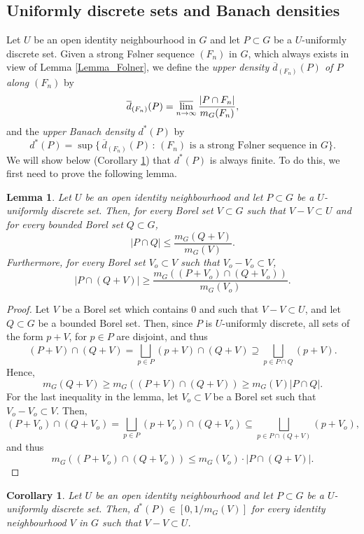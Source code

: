\documentclass[12pt,reqno,a4paper]{amsart}
\numberwithin{equation}{section}
\newcommand{\ra}{\rightarrow}
\theoremstyle{theorem}
\newtheorem{corollary}[theorem]{Corollary}
\newtheorem{lemma}[theorem]{Lemma}
\theoremstyle{task}
\theoremstyle{definition}
\begin{document}
\subsection{Uniformly discrete sets and Banach densities}
\label{subsec:Banach}
Let $U$ be an open identity neighbourhood in $G$ and let $P \subset G$ be a $U$-uniformly discrete set. Given a strong F\o lner sequence $(F_n)$ in $G$, which always exists in view of Lemma \ref{Lemma_Folner}, we define
the \emph{upper density $\overline{d}_{(F_n)}(P)$ of $P$ along $(F_n)$} by 
\[
\overline{d}_{(F_n)}(P) = \varlimsup_{n \ra \infty} \frac{|P \cap F_n|}{m_G(F_n)},
\]
and the \emph{upper Banach density $d^*(P)$} by
\[
d^*(P) = \sup \big\{ \, \overline{d}_{(F_n)}(P) \, : \, \textrm{$(F_n)$ is a strong F\o lner sequence in $G$} \big\}.
\]
We will show below (Corollary \ref{cor_dstarfinite}) that $d^*(P)$ is always finite. To do this, we first need to prove the following lemma.
\begin{lemma}
\label{Lemma_UQV}
Let $U$ be an open identity neighbourhood and let $P \subset G$ be a $U$-uniformly discrete set. Then, for every  Borel set $V \subset G$ such that $V-V \subset U$
and for every bounded Borel set $Q \subset G$,
\[
|P \cap Q| \leq \frac{m_G(Q+V)}{m_G(V)}.
\]
Furthermore, for every Borel set $V_o \subset V$ such that $V_o - V_o \subset V$, 
\[
|P \cap (Q+V)| \geq \frac{m_G((P+V_o) \cap (Q+V_o))}{m_G(V_o)}.
\]
\end{lemma}

\begin{proof}
Let $V$ be a Borel set which contains $0$ and such that $V - V \subset U$, and let $Q \subset G$ be a bounded Borel set. Then, since $P$ is $U$-uniformly discrete, all sets of the form $p+V$, for $p \in P$ are disjoint, and thus
\begin{equation}
\label{PV}
(P + V) \cap (Q+V) = \bigsqcup_{p \in P} (p + V) \cap (Q+V) \supseteq \bigsqcup_{p \in P \cap Q} (p+V).
\end{equation}
Hence, 
\[
m_G(Q + V) \geq m_G((P + V) \cap (Q+V)) \geq m_G(V) |P \cap Q|.
\]
For the last inequality in the lemma, let $V_o \subset V$ be a Borel set such that $V_o - V_o \subset V$. Then,
\[
(P + V_o) \cap (Q+V_o) 
= 
\bigsqcup_{p \in P} (p + V_o) \cap (Q+V_o) \subseteq \bigsqcup_{p \in P \cap (Q+V)} (p+V_o),
\]
and thus
\[
m_G((P + V_o) \cap (Q+V_o)) \leq m_G(V_o) \cdot |P \cap (Q+V)|.
\]
\end{proof}

\begin{corollary}
\label{cor_dstarfinite}
Let $U$ be an open identity neighbourhood and let $P \subset G$ be a $U$-uniformly discrete set. Then, $d^*(P) \in [0,1/m_G(V)]$ for every identity neighbourhood $V$
in $G$ such that $V-V \subset U$.
\end{corollary}
\end{document}

